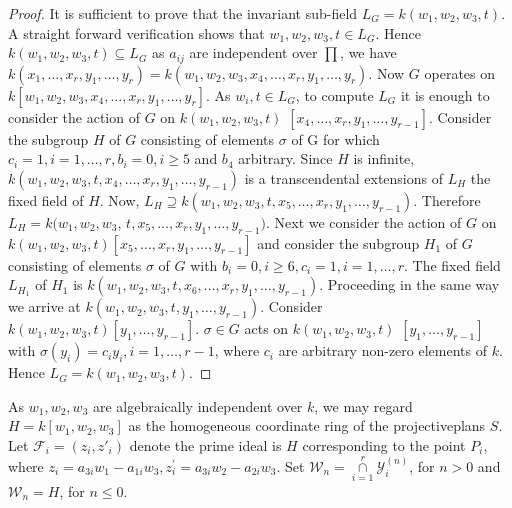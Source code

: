\begin{proof}
 It is sufficient to prove that the invariant sub-field 
 $L_G = k(w_1, w_2, w_3, t) $. A straight forward verification
 shows that $ w_1, w_2, w_3, t \in L_G$. Hence $ k(w_1, w_2, w_3,
 t) \subseteq L_G$ as $ a_{ij}$ are independent over $ \prod$, we
 have $ k(x_1, \dots , x_r, y_1, \dots , y_r) = k(w_1, w_2, w_3,
 x_4, \dots , x_r, y_1 , \dots , y_r)$. Now $G$ operates on $k[
  w_1, w_2, w_3, x_4, \dots , x_r, y_1, \dots , y_r ]$. As $w_i,
  t \in L_G$, to compute $L_G$ it is enough to consider the action of $G$
 on $k(w_1, w_2, w_3, t)$  $[ x_4, \dots , x_r, y_1, \dots , y_{r-1}
 ]$. Consider the subgroup $H$ of $G$ consisting of elements $\sigma$ of
 G for which $c_i = 1, i=1, \dots , r, b_i = 0, i \ge 5$ and
 $b_4$ arbitrary. Since $H$ is infinite, $k(w_1, w_2, w_3, t, x_4,
 \dots , x_r, y_1, \dots , y_{r-1})$ is a transcendental extensions
 of $ L_H$ the fixed field of $H$. Now, $L_H \supseteq k(w_1,
 w_2, w_3, t, x_5, \dots , x_r, y_1, \dots , y_{r-1})$. Therefore
 $ L_H = k(w_1, w_2, w_3$, $t, x_5, \dots , x_r, y_1, \dots ,
 y_{r-1})$. Next we consider the action of $G$ on $k(w_1, w_2, w_3,
 t) [ x_5, \dots , x_r,y_1, \dots , y_{r-1} ]$ and consider the
 subgroup $H_1$ of $G$ consisting of elements $\sigma$ of $G$ with $
 b_i = 0, i \ge 6, c_i = 1, i = 1, \dots , r$. The fixed field $
 L_{H_1}$ of $H_1 $ is $ k(w_1, w_2, w_3, t, x_6, \dots , x_r,
 y_1, \dots , y_{r-1})$. Proceeding in the same way we arrive at
 $k(w_1, w_2, w_3, t, y_1, \dots , y_{r-1})$. Consider $ k(w_1, 
 w_2, w_3, t) [ y_1, \dots , y_{r-1} ]$. $\sigma \in G$ acts on $
 k(w_1, w_2, w_3,t)$ $[y_1, \dots , y_{r-1}]$ with $ \sigma (y_i) =
 c_i y_i , i=1, \dots , r-1$, where $ c_i$ are arbitrary non-zero
 elements of $k$. Hence $ L_G = k(w_1, w_2, w_3,t)$. 
\end{proof}

As $ w_1, w_2, w_3 $ are algebraically independent over $k$, we may
regard $ H = k [w_1, w_2, w_3]$ as the homogeneous coordinate ring of
the projective\pageoriginale plans $S$. Let $\mathscr{F}_i = (z_i,
z'_i)$ denote the prime ideal is $H$ corresponding to the point $
P_i$, where $ z_i = 
a_{3i} w_1 - a_{1i} w_3, z_{i}^{\prime} = a_{3i} w_2 - a_{2i}
w_3$. Set $\mathcal{W}_n = \underset{i=1}{\overset{r}{\cap}}
\mathscr{Y}_{i}^{(n)} $, for $n > 0$ and $ \mathcal{W}_n = H $, for
$n\le 0$. 

